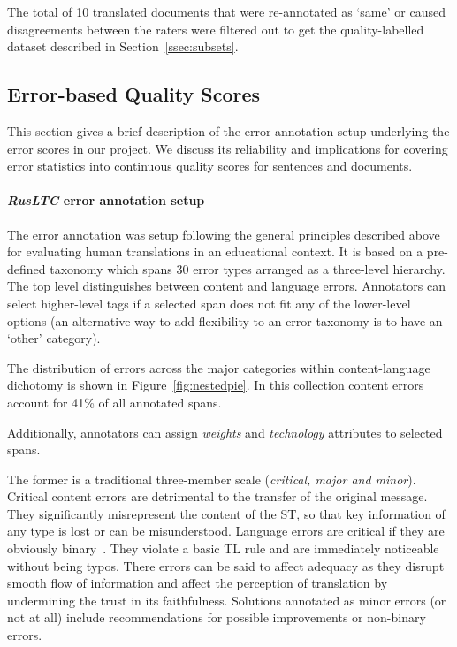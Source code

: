 The total of 10 translated documents that were re-annotated as `same' or caused disagreements between the raters were filtered out to get the quality-labelled dataset described in Section~\ref{ssec:subsets}.

\subsection{\label{ssec:err}Error-based Quality Scores}
This section gives a brief description of the error annotation setup underlying the error scores in our project. We discuss its reliability and implications for covering error statistics into continuous quality scores for sentences and documents.  

\paragraph{\textit{RusLTC} error annotation setup} 
The error annotation was setup following the general principles described above for evaluating human translations in an educational context. It is based on a pre-defined taxonomy which spans 30 error types arranged as a three-level hierarchy. The top level distinguishes between content and language errors. Annotators can select higher-level tags if a selected span does not fit any of the lower-level options (an alternative way to add flexibility to an error taxonomy is to have an `other' category).


The distribution of errors across the major categories within content-language dichotomy is shown in Figure~\ref{fig:nestedpie}. In this collection content errors account for 41\% of all annotated spans. 

Additionally, annotators can assign \textit{weights} and \textit{technology} attributes to selected spans. 

The former is a traditional three-member scale (\textit{critical, major and minor}). Critical content errors are detrimental to the transfer of the original message. They significantly misrepresent the content of the ST, so that key information of any type is lost or can be misunderstood. Language errors are critical if they are obviously binary~\cite{Pym1992}. They violate a basic TL rule and are immediately noticeable without being typos. There errors can be said to affect adequacy as they disrupt smooth flow of information and affect the perception of translation by undermining the trust in its faithfulness. Solutions annotated as minor errors (or not at all) include recommendations for possible improvements or non-binary errors.

